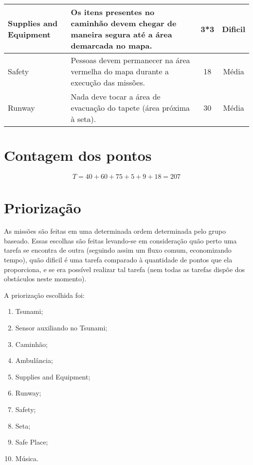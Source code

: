 \begin{table}[h]
\begin{tabular}{|l|p{8cm}|c|c|}
Supplies and Equipment                         & Os itens presentes no caminhão devem chegar de maneira segura até a área demarcada no mapa.                                     & 3*3                                      & Dificil                                     \\ \hline
Safety                         & Pessoas devem permanecer na área vermelha do mapa durante a execução das missões.                                     & 18                                      & Média                                     \\ \hline
Runway                         & Nada deve tocar a área de evacuação do tapete (área próxima à seta).                                     & 30                                      & Média                                     \\ \hline




\end{tabular}
\end{table}

\section{Contagem dos pontos}
\begin{equation}
  T = 40+60+75+5+9+18 = 207
\end{equation}


\section{Priorização}

As missões são feitas em uma determinada ordem determinada pelo grupo baseado. Essas escolhas são feitas levando-se em consideração quão perto uma tarefa se encontra de outra (seguindo assim um fluxo comum, economizando tempo), quão dificil é uma tarefa comparado à quantidade de pontos que ela proporciona, e se era possível realizar tal tarefa (nem todas as tarefas dispõe dos obstáculos neste momento).

A priorização escolhida foi:

\begin{enumerate}
\item Tsunami;
\item Sensor auxiliando no Tsunami;
\item Caminhão;
\item Ambulância;
\item Supplies and Equipment;
\item Runway;
\item Safety;
\item Seta;
\item Safe Place;
\item Música.
\end{enumerate}

